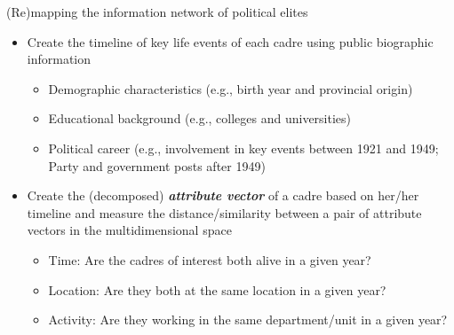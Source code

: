 \documentclass[
  10pt,
  ignorenonframetext,
]{beamer}
\begin{document}
\begin{frame}{(Re)mapping the information network of political elites}
\label{remapping-the-information-network-of-political-elites-1}
\begin{itemize}
  \item Create the timeline of key life events of each cadre using public biographic information
  \vspace{0.1cm}
  \begin{itemize}
    \item Demographic characteristics (e.g., birth year and provincial origin)
    \item Educational background (e.g., colleges and universities)
    \item Political career (e.g., involvement in key events between 1921 and 1949; Party and government posts after 1949)
  \end{itemize}
  \vspace{0.2cm}
  \item Create the (decomposed) \textbf{\textit{attribute vector}} of a cadre based on her/her timeline and measure the distance/similarity between a pair of attribute vectors in the multidimensional space
  \vspace{0.1cm}
  \begin{itemize}
    \item Time: Are the cadres of interest both alive in a given year?
    \item Location: Are they both at the same location in a given year?
    \item Activity: Are they working in the same department/unit in a given year?
  \end{itemize}
\end{itemize}
\end{frame}
\end{document}
